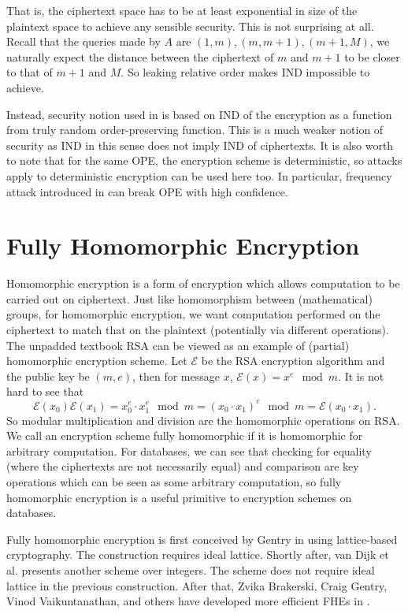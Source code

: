 That is, the ciphertext space has to be at least exponential in size of the plaintext space to achieve any sensible security. This is not surprising at all. Recall that the queries made by $A$ are $(1, m), (m, m+1), (m+1, M)$, we naturally expect the distance between the ciphertext of $m$ and $m+1$ to be closer to that of $m+1$ and $M$. So leaking relative order makes IND impossible to achieve.

Instead, security notion used in \cite{Boldyreva:2009:OSE:1533674.1533691} is based on IND of the encryption as a function from truly random order-preserving function. This is a much weaker notion of security as IND in this sense does not imply IND of ciphertexts. It is also worth to note that for the same OPE, the encryption scheme is deterministic, so attacks apply to deterministic encryption can be used here too. In particular, frequency attack introduced in \cite{Naveed:2015:IAP:2810103.2813651} can break OPE with high confidence.




\section{Fully Homomorphic Encryption}
Homomorphic encryption is a form of encryption which allows computation to be carried out on ciphertext. Just like homomorphism between (mathematical) groups, for homomorphic encryption, we want computation performed on the ciphertext to match that on the plaintext (potentially via different operations). The unpadded textbook RSA \cite{Jonsson:2003:PCS:RFC3447} can be viewed as an example of (partial) homomorphic encryption scheme. Let $\mathcal{E}$ be the RSA encryption algorithm and the public key be $(m, e)$, then for message $x$, $\mathcal{E}(x) = x^e \mod m$. It is not hard to see that
\begin{equation*}
	\mathcal{E}(x_0) \mathcal{E}(x_1) = x_0^e \cdot x_1^e \mod m = (x_0 \cdot x_1)^e \mod m = \mathcal{E}(x_0 \cdot x_1).
\end{equation*}
So modular multiplication and division are the homomorphic operations on RSA. We call an encryption scheme fully homomorphic if it is homomorphic for arbitrary computation. For databases, we can see that checking for equality (where the ciphertexts are not necessarily equal) and comparison are key operations which can be seen as some arbitrary computation, so fully homomorphic encryption is a useful primitive to encryption schemes on databases.

Fully homomorphic encryption is first conceived by Gentry in \cite{Gentry:2009:FHE:1536414.1536440} using lattice-based cryptography. The construction requires ideal lattice. Shortly after, van Dijk et al. presents another scheme over integers. The scheme does not require ideal lattice in the previous construction. After that, Zvika Brakerski, Craig Gentry, Vinod Vaikuntanathan, and others have developed more efficient FHEs in \cite{cryptoeprint:2011:277, cryptoeprint:2012:078, cryptoeprint:2013:094, cryptoeprint:2013:340}.

